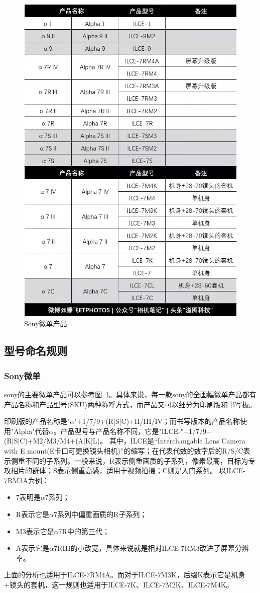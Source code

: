 \documentclass{ctexart}
\begin{document}
\begin{figure}[h!]
    \centering
    \includegraphics[width=.7\linewidth]{imgs/sony_product.jpeg}
    \caption{Sony微单产品}
    \label{fig_sony_products}
\end{figure}

\subsection{型号命名规则}

\subsubsection{Sony微单~\cite{sony_products_analysis}}
sony的主要微单产品可以参考图~\ref{fig_sony_products}。具体来说，每一款sony的全画幅微单产品都有产品名称和产品型号(SKU)两种称呼方式，而产品又可以细分为印刷版和书写板。

印刷版的产品名称是"$\alpha$"+1/7/9+(R|S|C)+II/III/IV；而书写版本的产品名称使用"Alpha"代替$\alpha$。产品型号与产品名称不同，它是"ILCE-"+1/7/9+(R|S|C)+M2/M3/M4+(A|K|L)。
其中，ILCE是“Interchangable Lens Camera with E mount(E卡口可更换镜头相机)”的缩写；在代表代数的数字后的R/S/C表示侧重不同的子系列。一般来说，R表示侧重画质的子系列，像素最高，目标为专攻相片的群体；S表示侧重高感，适用于视频拍摄；C则是入门系列。
以ILCE-7RM3A为例：
\begin{itemize}
    \item 7表明是$\alpha$7系列；
    \item R表示它是$\alpha$7系列中偏重画质的R子系列；
    \item M3表示它是$\alpha$7R中的第三代；
    \item A表示它是$\alpha$7RIII的小改宽，具体来说就是相对ILCE-7RM3改进了屏幕分辨率。
\end{itemize}
上面的分析也适用于ILCE-7RM4A。而对于ILCE-7M3K，后缀K表示它是机身+镜头的套机，这一规则也适用于ILCE-7K、ILCE-7M2K、ILCE-7M4K。
\end{document}

